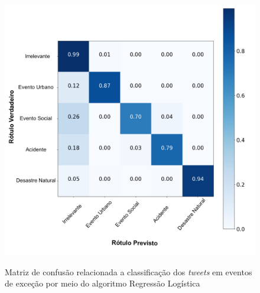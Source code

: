 \documentclass[
	12pt,				%
	oneside,			%
	a4paper,			%
	english,			%
	brazil				%
	]{abntex2ppgsi}
\begin{document}
{{\begin{apendicesenv}
\begin{figure}[!htb]
	\centering
 	  \caption{Matriz de confusão relacionada a classificação dos \textit{tweets} em eventos de exceção por meio do algoritmo Regressão Logística}
		\includegraphics[width=1\linewidth]{images/confusion_matrix_lr_pt.png}
	\label{fig:confusion_matrix_rl}
\end{figure}


\end{apendicesenv}}}
\end{document}
